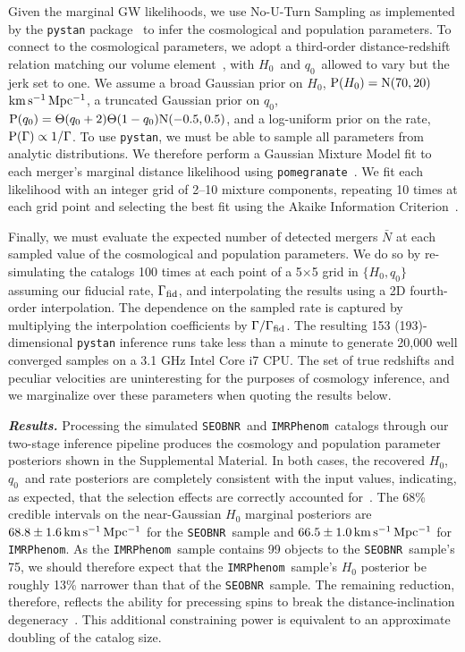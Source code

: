 \documentclass[%
 reprint,
 superscriptaddress,
 nofootinbib,
 amsmath,amssymb,
 aps,
]{revtex4-2}
\newcommand{\hubble}{\ensuremath{H_0}}
\newcommand{\decel}{\ensuremath{q_0}}
\newcommand{\prob}{\ensuremath{{\rm P}}}
\newcommand{\normal}{{\rm{N}}}
\newcommand{\nexp}{\bar{N}}
\newcommand{\rate}{\Gamma}
\newcommand{\step}{\Theta}
\newcommand{\kmsmpc}{\ensuremath{{\rm km\,s^{-1}\,Mpc^{-1}}}}
\newcommand{\seobnr}{\texttt{SEOBNR}}
\newcommand{\imrp}{\texttt{IMRPhenom}}
\begin{document}
Given the marginal GW likelihoods, we use No-U-Turn Sampling as implemented by the \texttt{pystan} package~\cite{pystan} to infer the cosmological and population parameters. To connect to the cosmological parameters, we adopt a third-order distance-redshift relation matching our volume element~\cite{Visser:2004}, with \hubble\ and \decel\ allowed to vary but the jerk set to one. We assume a broad Gaussian prior on \hubble, $\prob(\hubble)=\normal(70,20)$ \kmsmpc, a truncated Gaussian prior on \decel, $\prob(\decel)=\step(\decel+2)\step(1-\decel)\normal(-0.5,0.5)$, and a log-uniform prior on the rate, $\prob(\rate) \propto 1/\rate$. To use \texttt{pystan}, we must be able to sample all parameters from analytic distributions. We therefore perform a Gaussian Mixture Model fit to each merger's marginal distance likelihood using \texttt{pomegranate}~\cite{Schreiber:2017}. We fit each likelihood with an integer grid of 2--10 mixture components, repeating 10 times at each grid point and selecting the best fit using the Akaike Information Criterion~\cite{Akaike:1974}.

Finally, we must evaluate the expected number of detected mergers $\nexp$ at each sampled value of the cosmological and population parameters. We do so by re-simulating the catalogs 100 times at each point of a 5$\times$5 grid in $\{H_0,q_0\}$ assuming our fiducial rate, $\Gamma_{\rm fid}$, and interpolating the results using a 2D fourth-order interpolation. The dependence on the sampled rate is captured by multiplying the interpolation coefficients by $\Gamma/\Gamma_{\rm fid}$. The resulting 153 (193)-dimensional \texttt{pystan} inference runs take less than a minute to generate 20,000 well converged samples on a 3.1 GHz Intel Core i7 CPU. The set of true redshifts and peculiar velocities are uninteresting for the purposes of cosmology inference, and we marginalize over these parameters when quoting the results below.


\textbf{\emph{Results.}} Processing the simulated \seobnr\ and \imrp\ catalogs through our two-stage inference pipeline produces the cosmology and population parameter posteriors shown in the Supplemental Material. In both cases, the recovered \hubble, \decel\ and rate posteriors are completely consistent with the input values, indicating, as expected, that the selection effects are correctly accounted for~\cite{Mortlock_etal:2019}. The 68\% credible intervals on the near-Gaussian $\hubble$ marginal posteriors are $68.8 \pm 1.6\,\kmsmpc$ for the \seobnr\ sample and $66.5 \pm 1.0\,\kmsmpc$ for \imrp. As the \imrp\ sample contains 99 objects to the \seobnr\ sample's 75, we should therefore expect that the \imrp\ sample's $\hubble$ posterior be roughly 13\% narrower than that of the \seobnr\ sample. The remaining reduction, therefore, reflects the ability for precessing spins to break the distance-inclination degeneracy~\cite[e.g.,][]{Apostolatos_etal:1994,Cutler_Flanagan:1994,Vecchio:2004,Chen_etal:2018}. This additional constraining power is equivalent to an approximate doubling of the catalog size.
\end{document}
